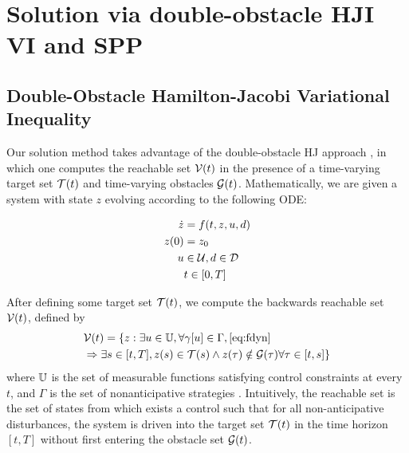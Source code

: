 \section{Solution via double-obstacle HJI VI and SPP\label{sec:solution}}
\subsection{Double-Obstacle Hamilton-Jacobi Variational Inequality}
Our solution method takes advantage of the double-obstacle HJ approach \cite{Fisac15}, in which one computes the reachable set $\mathcal{V}(t)$ in the presence of a time-varying target set $\mathcal{T}(t)$ and time-varying obstacles $\mathcal{G}(t)$. Mathematically, we are given a system with state $z$ evolving according to the following ODE:

\begin{equation}
\label{eq:fdyn} %
\begin{aligned}
\dot{z} &= f(t, z, u, d) \\
z(0) &= z_0 \\
u &\in \cset, d \in \dset \\
&t \in [0, T]
\end{aligned}
\end{equation}

After defining some target set $\mathcal{T}(t)$, we compute the backwards reachable set $\mathcal{V}(t)$, defined by
%
\begin{equation}
\label{eq:brs}
\begin{aligned}
&\mathcal{V}(t) = \{z: \exists u \in \mathbb{U}, \forall \gamma[u] \in \Gamma, \eqref{eq:fdyn} \\
&\Rightarrow \exists s \in [t, T], z(s) \in \mathcal{T}(s) \wedge z(\tau) \notin \mathcal{G}(\tau) \forall \tau \in [t, s]\}
\end{aligned}
\end{equation}
%
\noindent where $\mathbb{U}$ is the set of measurable functions satisfying control constraints at every $t$, and $\Gamma$ is the set of nonanticipative strategies \cite{Mitchell05}. Intuitively, the reachable set is the set of states from which exists a control such that for all non-anticipative disturbances, the system is driven into the target set $\mathcal{T}(t)$ in the time horizon $[t, T]$ without first entering the obstacle set $\mathcal{G}(t)$.

